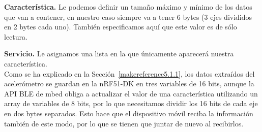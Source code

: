 \textbf{Característica.} Le podemos definir un tamaño máximo y mínimo de los datos que van a contener, en nuestro caso siempre va a tener 6 bytes (3 ejes divididos en 2 bytes cada uno). También especificamos aquí que este valor es de sólo lectura.

\textbf{Servicio.} Le asignamos una lista en la que únicamente aparecerá nuestra característica.\\

Como se ha explicado en la Sección~\ref{makereference5.1.1}, los datos extraídos del acelerómetro se guardan en la nRF51-DK en tres variables de 16 bits, aunque la API BLE de mbed obliga a actualizar el valor de una característica utilizando un array de variables de 8 bits, por lo que necesitamos dividir los 16 bits de cada eje en dos bytes separados. Esto hace que el dispositivo móvil reciba la información también de este modo, por lo que se tienen que juntar de nuevo al recibirlos.

